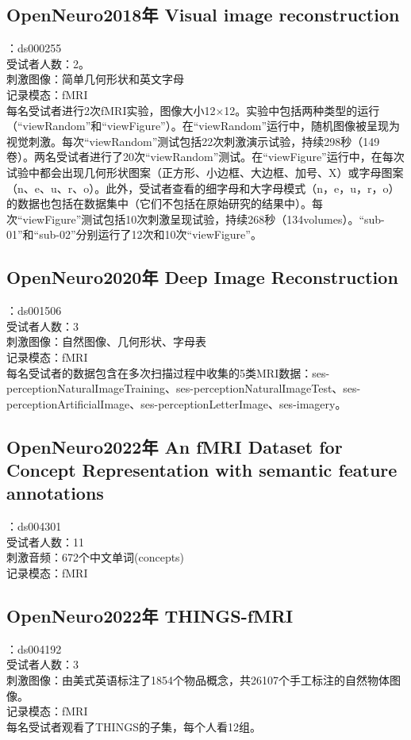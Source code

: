\documentclass[12pt, a4paper, oneside]{ctexart}
\begin{document}
    \subsection{OpenNeuro2018年 Visual image reconstruction}
    ：ds000255\\
    受试者人数：2。\\
    刺激图像：简单几何形状和英文字母\\
    记录模态：fMRI\\
    每名受试者进行2次fMRI实验，图像大小12×12。实验中包括两种类型的运行（“viewRandom”和“viewFigure”）。在“viewRandom”运行中，随机图像被呈现为视觉刺激。每次“viewRandom”测试包括22次刺激演示试验，持续298秒（149卷）。两名受试者进行了20次“viewRandom”测试。在“viewFigure”运行中，在每次试验中都会出现几何形状图案（正方形、小边框、大边框、加号、X）或字母图案（n、e、u、r、o）。此外，受试者查看的细字母和大字母模式（n，e，u，r，o）的数据也包括在数据集中（它们不包括在原始研究的结果中）。每次“viewFigure”测试包括10次刺激呈现试验，持续268秒（134volumes）。“sub-01”和“sub-02”分别运行了12次和10次“viewFigure”。

    \subsection{OpenNeuro2020年 Deep Image Reconstruction}
    ：ds001506\\
    受试者人数：3\\
    刺激图像：自然图像、几何形状、字母表\\
    记录模态：fMRI\\
    每名受试者的数据包含在多次扫描过程中收集的5类MRI数据：ses-perceptionNaturalImageTraining、ses-perceptionNaturalImageTest、ses-perceptionArtificialImage、ses-perceptionLetterImage、ses-imagery。

    \subsection{OpenNeuro2022年 An fMRI Dataset for Concept Representation with semantic feature annotations}
    ：ds004301\\
    受试者人数：11\\
    刺激音频：672个中文单词(concepts)\\
    记录模态：fMRI\\

    \subsection{OpenNeuro2022年 THINGS-fMRI}
    ：ds004192\\
    受试者人数：3\\
    刺激图像：由美式英语标注了1854个物品概念，共26107个手工标注的自然物体图像。\\
    记录模态：fMRI\\
    每名受试者观看了THINGS的子集，每个人看12组。
\end{document}
